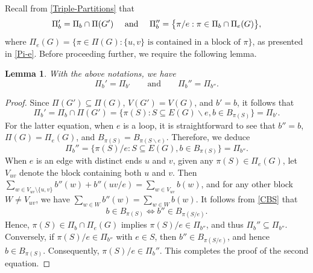 \documentclass[12pt]{article}%
\renewcommand*{\bm}[1]{#1}%
\numberwithin{equation}{section}
\def\And{\mbox{\rm ~and~}}
\newtheorem{lemma}[lemma]{Lemma}
\begin{document}
Recall from \eqref{Triple-Partitions} that 
\[
\Pi_{\bm b}'=\Pi_{\bm b}\cap\Pi(G')\quad\And\quad \Pi_{\bm b}''=\big\{\pi/e:\pi\in\Pi_{\bm b}\cap\Pi_e(G)\big\},
\]
where $\Pi_e(G)=\big\{\pi\in\Pi(G):\{u,v\} \text{ is contained in a block of } \pi\big\}$, as presented in \eqref{Pi-e}. Before proceeding further, we require the following lemma. 
\begin{lemma}\label{lem:deletion-contraction for selection}
With the above notations, we have
\[
\Pi_{\bm b}'=\Pi_{\bm b'}\quad\quad\text{and}\quad\quad\Pi_{\bm b}''=\Pi_{\bm b''}.
\]
\end{lemma}
\begin{proof}
Since $\Pi(G')\subseteq\Pi(G)$, $V(G')=V(G)$, and $\bm b'=\bm b$, it follows that 
\[
\Pi_{\bm b}'=\Pi_{\bm b}\cap\Pi(G')=\big\{\pi(S):S\subseteq E(G)\smallsetminus e, \bm b\in B_{\pi(S)}\big\}=\Pi_{\bm b'}.
\]
For the latter equation, when $e$ is a loop, it is straightforward to see that $\bm b''=\bm b$, $\Pi(G)=\Pi_e(G)$, and $B_{\pi(S)}=B_{\pi(S\smallsetminus e)}$.
Therefore, we deduce
\[
\Pi_{\bm b}''=\big\{\pi(S)/e:S\subseteq E(G), \bm b\in B_{\pi(S)}\big\}=\Pi_{\bm b''}.
\]
When $e$ is an edge with distinct ends $u$ and $v$, given any $\pi(S)\in\Pi_e(G)$, let $V_{uv}$ denote the block containing both $u$ and $v$. Then
$\sum_{w\in V_{uv}\setminus\{u,v\}}\bm b''(w)+\bm b''(uv/e)=\sum_{w\in V_{uv}}\bm b(w)$, and for any other block $W\ne V_{uv}$, we have $\sum_{w\in W}\bm b''(w)=\sum_{w\in W}\bm b(w)$. It follows from \eqref{CBS} that 
\[
\bm b\in B_{\pi(S)}\Longleftrightarrow\bm b''\in B_{\pi(S/e)}.
\]
Hence, $\pi(S)\in\Pi_{\bm b}\cap\Pi_e(G)$ implies $\pi(S)/e\in\Pi_{\bm b''}$, and thus $\Pi_{\bm b}''\subseteq\Pi_{\bm b''}$. Conversely, if $\pi(S)/e\in\Pi_{\bm b''}$ with $e\in S$, then $\bm b''\in B_{\pi(S/e)}$, and hence $\bm b\in B_{\pi(S)}$. Consequently, $\pi(S)/e\in\Pi_{\bm b}''$. This completes the proof of the second equation.
\end{proof}
\end{document}
